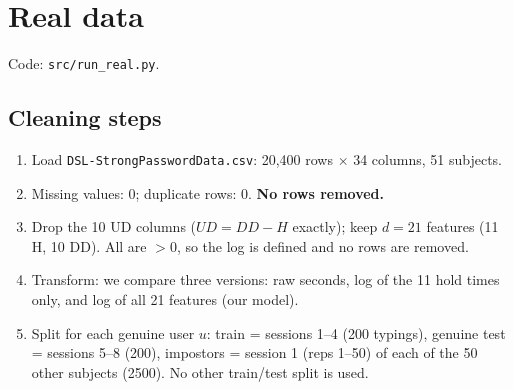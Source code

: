 \documentclass[11pt]{article}
\theoremstyle{definition}
\begin{document}
\section{Real data}\label{sec:real}
Code: \texttt{src/run\_real.py}.

\subsection{Cleaning steps}
\begin{enumerate}[leftmargin=*]
\item Load \texttt{DSL-StrongPasswordData.csv}: 20,400 rows $\times$ 34 columns, 51 subjects.
\item Missing values: 0; duplicate rows: 0. \textbf{No rows removed.}
\item Drop the 10 UD columns ($UD=DD-H$ exactly); keep $d=21$ features (11 H, 10 DD). All are $>0$, so the log is defined and no rows are removed.
\item Transform: we compare three versions: raw seconds, log of the 11 hold times only, and log of all 21 features (our model).
\item Split for each genuine user $u$: train = sessions 1--4 (200 typings), genuine test = sessions 5--8 (200), impostors = session 1 (reps 1--50) of each of the 50 other subjects (2500). No other train/test split is used.
\end{enumerate}
\end{document}
